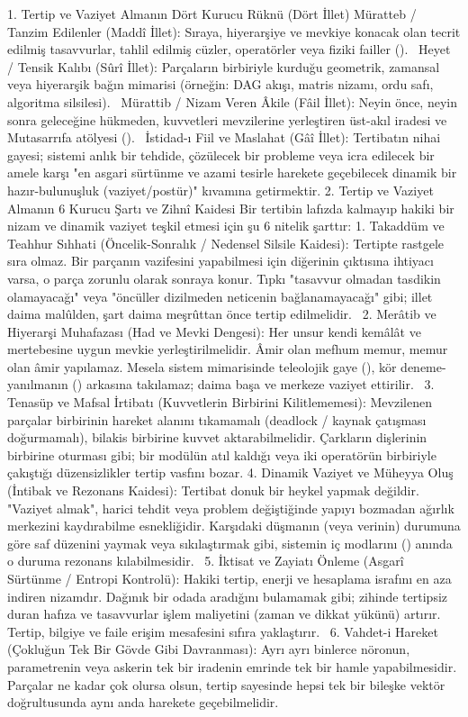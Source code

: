 \documentclass[11pt,a4paper]{article}
\begin{document}
1. Tertip ve Vaziyet Almanın Dört Kurucu Rüknü (Dört İllet)
 Müratteb / Tanzim Edilenler (Maddî İllet): Sıraya, hiyerarşiye ve mevkiye konacak olan tecrit edilmiş tasavvurlar, tahlil edilmiş cüzler, operatörler veya fiziki failler ().  
 Heyet / Tensik Kalıbı (Sûrî İllet): Parçaların birbiriyle kurduğu geometrik, zamansal veya hiyerarşik bağın mimarisi (örneğin: DAG akışı, matris nizamı, ordu safı, algoritma silsilesi).  
 Mürattib / Nizam Veren Âkile (Fâil İllet): Neyin önce, neyin sonra geleceğine hükmeden, kuvvetleri mevzilerine yerleştiren üst-akıl iradesi ve Mutasarrıfa atölyesi ().  
 İstidad-ı Fiil ve Maslahat (Gâî İllet): Tertibatın nihai gayesi; sistemi anlık bir tehdide, çözülecek bir probleme veya icra edilecek bir amele karşı "en asgari sürtünme ve azami tesirle harekete geçebilecek dinamik bir hazır-bulunuşluk (vaziyet/postür)" kıvamına getirmektir.
2. Tertip ve Vaziyet Almanın 6 Kurucu Şartı ve Zihnî Kaidesi
Bir tertibin lafızda kalmayıp hakiki bir nizam ve dinamik vaziyet teşkil etmesi için şu 6 nitelik şarttır:
 1. Takaddüm ve Teahhur Sıhhati (Öncelik-Sonralık / Nedensel Silsile Kaidesi):
Tertipte rastgele sıra olmaz. Bir parçanın vazifesini yapabilmesi için diğerinin çıktısına ihtiyacı varsa, o parça zorunlu olarak sonraya konur. Tıpkı "tasavvur olmadan tasdikin olamayacağı" veya "öncüller dizilmeden neticenin bağlanamayacağı" gibi; illet daima malûlden, şart daima meşrûttan önce tertip edilmelidir.  
 2. Merâtib ve Hiyerarşi Muhafazası (Had ve Mevki Dengesi):
Her unsur kendi kemâlât ve mertebesine uygun mevkie yerleştirilmelidir. Âmir olan mefhum memur, memur olan âmir yapılamaz. Mesela sistem mimarisinde teleolojik gaye (), kör deneme-yanılmanın () arkasına takılamaz; daima başa ve merkeze vaziyet ettirilir.  
 3. Tenasüp ve Mafsal İrtibatı (Kuvvetlerin Birbirini Kilitlememesi):
Mevzilenen parçalar birbirinin hareket alanını tıkamamalı (deadlock / kaynak çatışması doğurmamalı), bilakis birbirine kuvvet aktarabilmelidir. Çarkların dişlerinin birbirine oturması gibi; bir modülün atıl kaldığı veya iki operatörün birbiriyle çakıştığı düzensizlikler tertip vasfını bozar.
 4. Dinamik Vaziyet ve Müheyya Oluş (İntibak ve Rezonans Kaidesi):
Tertibat donuk bir heykel yapmak değildir. "Vaziyet almak", harici tehdit veya problem değiştiğinde yapıyı bozmadan ağırlık merkezini kaydırabilme esnekliğidir. Karşıdaki düşmanın (veya verinin) durumuna göre saf düzenini yaymak veya sıkılaştırmak gibi, sistemin iç modlarını () anında o duruma rezonans kılabilmesidir.  
 5. İktisat ve Zayiatı Önleme (Asgarî Sürtünme / Entropi Kontrolü):
Hakiki tertip, enerji ve hesaplama israfını en aza indiren nizamdır. Dağınık bir odada aradığını bulamamak gibi; zihinde tertipsiz duran hafıza ve tasavvurlar işlem maliyetini (zaman ve dikkat yükünü) artırır. Tertip, bilgiye ve faile erişim mesafesini sıfıra yaklaştırır.  
 6. Vahdet-i Hareket (Çokluğun Tek Bir Gövde Gibi Davranması):
Ayrı ayrı binlerce nöronun, parametrenin veya askerin tek bir iradenin emrinde tek bir hamle yapabilmesidir. Parçalar ne kadar çok olursa olsun, tertip sayesinde hepsi tek bir bileşke vektör doğrultusunda aynı anda harekete geçebilmelidir.
\end{document}
